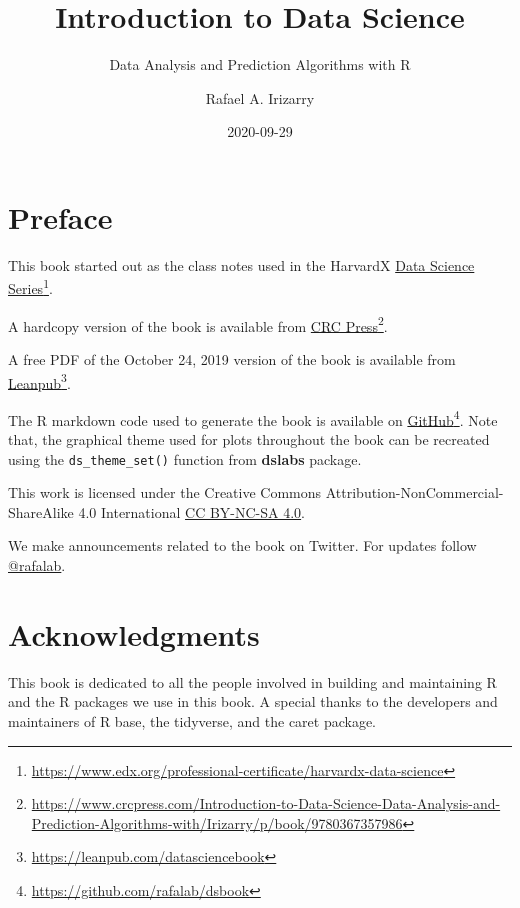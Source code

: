 \documentclass[
]{krantz}
\title{Introduction to Data Science}
\subtitle{Data Analysis and Prediction Algorithms with R}
\author{Rafael A. Irizarry}
\date{2020-09-29}
\begin{document}
\maketitle

{
\hypersetup{linkcolor=}
\setcounter{tocdepth}{2}
\tableofcontents
}
\listoftables
\listoffigures
\hypertarget{preface}{%
\chapter*{Preface}\label{preface}}


This book started out as the class notes used in the
HarvardX \href{https://www.edx.org/professional-certificate/harvardx-data-science}{Data Science Series}\footnote{\url{https://www.edx.org/professional-certificate/harvardx-data-science}}.

A hardcopy version of the book is available from \href{https://www.crcpress.com/Introduction-to-Data-Science-Data-Analysis-and-Prediction-Algorithms-with/Irizarry/p/book/9780367357986}{CRC Press}\footnote{\url{https://www.crcpress.com/Introduction-to-Data-Science-Data-Analysis-and-Prediction-Algorithms-with/Irizarry/p/book/9780367357986}}.

A free PDF of the October 24, 2019 version of the book is available from \href{https://leanpub.com/datasciencebook}{Leanpub}\footnote{\url{https://leanpub.com/datasciencebook}}.

The R markdown code used to generate the book is available on \href{https://github.com/rafalab/dsbook}{GitHub}\footnote{\url{https://github.com/rafalab/dsbook}}. Note that, the graphical theme used for plots throughout the book can be recreated using the \texttt{ds\_theme\_set()} function from \textbf{dslabs} package.

This work is licensed under the Creative Commons Attribution-NonCommercial-ShareAlike 4.0 International \href{https://creativecommons.org/licenses/by-nc-sa/4.0}{CC BY-NC-SA 4.0}.

We make announcements related to the book on Twitter. For updates follow \href{https://twitter.com/rafalab}{@rafalab}.

\hypertarget{acknowledgments}{%
\chapter*{Acknowledgments}\label{acknowledgments}}


This book is dedicated to all the people involved in building and maintaining R and the R packages we use in this book. A special thanks to the developers and maintainers of R base, the tidyverse, and the caret package.
\end{document}
